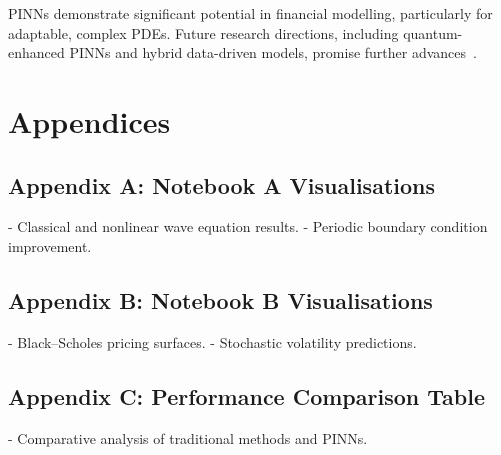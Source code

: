\documentclass[12pt,a4paper]{article}
\begin{document}
PINNs demonstrate significant potential in financial modelling, particularly for adaptable, complex PDEs. Future research directions, including quantum-enhanced PINNs and hybrid data-driven models, promise further advances~\cite{zhang2022quantum,mcardle2020quantum}.

\newpage
\section*{Appendices}

\subsection*{Appendix A: Notebook A Visualisations}

- Classical and nonlinear wave equation results.
- Periodic boundary condition improvement.

\subsection*{Appendix B: Notebook B Visualisations}

- Black–Scholes pricing surfaces.
- Stochastic volatility predictions.

\subsection*{Appendix C: Performance Comparison Table}

- Comparative analysis of traditional methods and PINNs.

\newpage


\end{document}
